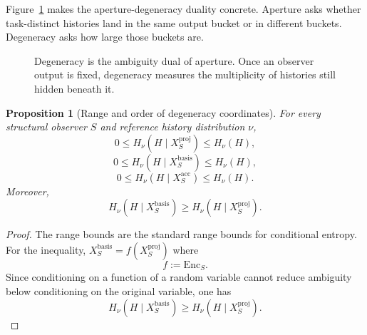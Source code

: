 \documentclass[11pt,twoside]{article}
\newtheorem{proposition}[theorem]{Proposition}
\theoremstyle{definition}
\newcommand{\Enc}{\mathrm{Enc}}
\newcommand{\proj}{\mathrm{proj}}
\newcommand{\basis}{\mathrm{basis}}
\newcommand{\acc}{\mathrm{acc}}
\begin{document}
Figure~\ref{fig:degeneracy-buckets} makes the aperture-degeneracy duality concrete. Aperture asks whether task-distinct histories land in the same output bucket or in different buckets. Degeneracy asks how large those buckets are.

\begin{figure}[t]
\centering
{}
\caption{Degeneracy is the ambiguity dual of aperture. Once an observer output is fixed, degeneracy measures the multiplicity of histories still hidden beneath it.}
\label{fig:degeneracy-buckets}
\end{figure}

\begin{proposition}[Range and order of degeneracy coordinates]
\label{prop:deg-range-order}
For every structural observer \(S\) and reference history distribution \(\nu\),
\[
  0
  \le
  H_\nu(H\mid X_S^{\proj})
  \le
  H_\nu(H),
\]
\[
  0
  \le
  H_\nu(H\mid X_S^{\basis})
  \le
  H_\nu(H),
\]
\[
  0
  \le
  H_\nu(H\mid X_S^{\acc})
  \le
  H_\nu(H).
\]
Moreover,
\[
  H_\nu(H\mid X_S^{\basis})
  \ge
  H_\nu(H\mid X_S^{\proj}).
\]
\end{proposition}

\begin{proof}
The range bounds are the standard range bounds for conditional entropy. For the inequality, \(X_S^{\basis} = f(X_S^{\proj})\) where
\[
  f := \Enc_S.
\]
Since conditioning on a function of a random variable cannot reduce ambiguity below conditioning on the original variable, one has
\[
  H_\nu(H\mid X_S^{\basis})
  \ge
  H_\nu(H\mid X_S^{\proj}).
\]
\end{proof}
\end{document}
